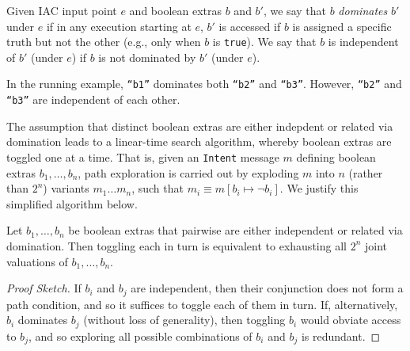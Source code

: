 \begin{definition} Given IAC input point $e$ and boolean extras $b$ and $b'$, we say that $b$ \emph{dominates} $b'$ under $e$ if in any execution starting at $e$, $b'$ is accessed if $b$ is assigned a specific truth but not the other (e.g., only when $b$ is {\tt true}). We say that $b$ is independent of $b'$ (under $e$) if $b$ is not dominated by $b'$ (under $e$).
\end{definition}

In the running example, {\tt ``b1''} dominates both {\tt ``b2''} and {\tt ``b3''}. However, {\tt ``b2''} and {\tt ``b3''} are independent of each other.

The assumption that distinct boolean extras are either indepdent or related via domination leads to a linear-time search algorithm, whereby boolean extras are toggled one at a time. That is, given an {\tt Intent} message $m$ defining boolean extras $b_1,\ldots,b_n$, path exploration is carried out by exploding $m$ into $n$ (rather than $2^n$) variants $m_1 \ldots m_n$, such that $m_i \equiv m[ b_i \mapsto \neg b_i ]$. We justify this simplified algorithm below.

\begin{lemma} Let $b_1,\ldots,b_n$ be boolean extras that pairwise are either independent or related via domination. Then toggling each in turn is equivalent to exhausting all $2^n$ joint valuations of $b_1,\ldots,b_n$.
\begin{proof}[Proof Sketch]
If $b_i$ and $b_j$ are independent, then their conjunction does not form a path condition, and so it suffices to toggle each of them in turn. If, alternatively, $b_i$ dominates $b_j$ (without loss of generality), then toggling $b_i$ would obviate access to $b_j$, and so exploring all possible combinations of $b_i$ and $b_j$ is redundant.
\end{proof}
\end{lemma}




